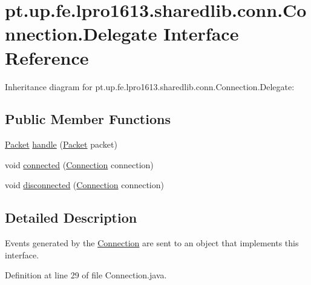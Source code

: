 \hypertarget{interfacept_1_1up_1_1fe_1_1lpro1613_1_1sharedlib_1_1conn_1_1_connection_1_1_delegate}{}\section{pt.\+up.\+fe.\+lpro1613.\+sharedlib.\+conn.\+Connection.\+Delegate Interface Reference}
\label{interfacept_1_1up_1_1fe_1_1lpro1613_1_1sharedlib_1_1conn_1_1_connection_1_1_delegate}


Inheritance diagram for pt.\+up.\+fe.\+lpro1613.\+sharedlib.\+conn.\+Connection.\+Delegate\+:
\subsection*{Public Member Functions}
\begin{DoxyCompactItemize}
\item 
\hyperlink{classpt_1_1up_1_1fe_1_1lpro1613_1_1sharedlib_1_1conn_1_1_packet}{Packet} \hyperlink{interfacept_1_1up_1_1fe_1_1lpro1613_1_1sharedlib_1_1conn_1_1_connection_1_1_delegate_a5b0f77e34d93967ae53cf7e01f0e2835}{handle} (\hyperlink{classpt_1_1up_1_1fe_1_1lpro1613_1_1sharedlib_1_1conn_1_1_packet}{Packet} packet)
\item 
void \hyperlink{interfacept_1_1up_1_1fe_1_1lpro1613_1_1sharedlib_1_1conn_1_1_connection_1_1_delegate_afeb3c54ced46916733df2ba0b0e2d87e}{connected} (\hyperlink{classpt_1_1up_1_1fe_1_1lpro1613_1_1sharedlib_1_1conn_1_1_connection}{Connection} connection)
\item 
void \hyperlink{interfacept_1_1up_1_1fe_1_1lpro1613_1_1sharedlib_1_1conn_1_1_connection_1_1_delegate_a39547a28a5b1818ca952e8d3d8da15ba}{disconnected} (\hyperlink{classpt_1_1up_1_1fe_1_1lpro1613_1_1sharedlib_1_1conn_1_1_connection}{Connection} connection)
\end{DoxyCompactItemize}


\subsection{Detailed Description}
Events generated by the \hyperlink{classpt_1_1up_1_1fe_1_1lpro1613_1_1sharedlib_1_1conn_1_1_connection}{Connection} are sent to an object that implements this interface. 

Definition at line 29 of file Connection.\+java.



